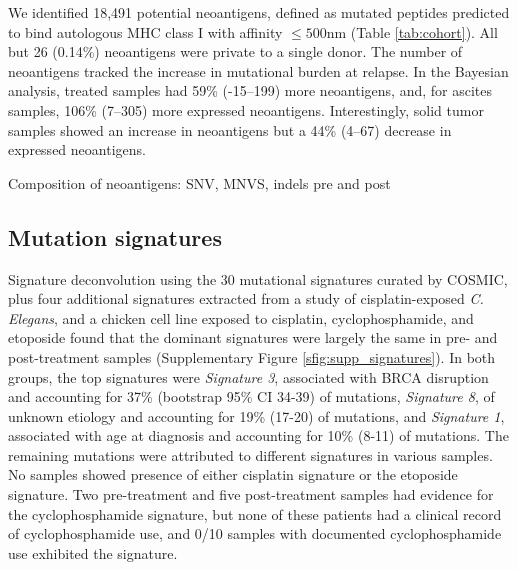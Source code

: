We identified 18,491 potential neoantigens, defined as mutated peptides predicted to bind autologous MHC class I with affinity $\leq 500$nm (Table \ref{tab:cohort}). All but 26 (0.14\%) neoantigens were private to a single donor. The number of neoantigens tracked the increase in mutational burden at relapse. In the Bayesian analysis, treated samples had 59\% (-15--199) more neoantigens, and, for ascites samples, 106\% (7--305) more expressed neoantigens. Interestingly, solid tumor samples showed an increase in neoantigens but a 44\% (4--67) decrease in expressed neoantigens.

Composition of neoantigens: SNV, MNVS, indels pre and post


\subsection*{Mutation signatures}
Signature deconvolution using the 30 mutational signatures curated by COSMIC\cite{364242}, plus four additional signatures extracted from a study of cisplatin-exposed \textit{C. Elegans}\cite{Meier_2014}, and a chicken cell line exposed to cisplatin, cyclophosphamide, and etoposide\cite{Szikriszt_2016} found that the dominant signatures were largely the same in pre- and post-treatment samples (Supplementary Figure \ref{sfig:supp_signatures}). In both groups, the top signatures were \textit{Signature 3}, associated with BRCA disruption and accounting for 37\% (bootstrap 95\% CI 34-39) of mutations, \textit{Signature 8}, of unknown etiology and accounting for 19\% (17-20) of mutations, and \textit{Signature 1}, associated with age at diagnosis and accounting for 10\% (8-11) of mutations. The remaining mutations were attributed to different signatures in various samples. No samples showed presence of either cisplatin signature or the etoposide signature. Two pre-treatment and five post-treatment samples had evidence for the cyclophosphamide signature, but none of these patients had a clinical record of cyclophosphamide use, and 0/10 samples with documented cyclophosphamide use exhibited the signature.

